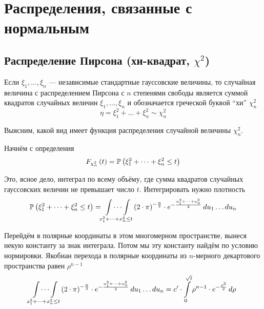 \section{Распределения, связанные с нормальным}

\subsection{Распределение Пирсона (хи-квадрат, $\chi^2$)}

\begin{definition}
  Если $\xi_1, \dots, \xi_n$ --- независимые стандартные гауссовские величины,
  то случайная величина с распределением Пирсона с $n$ степенями свободы
  является суммой квадратов случайных величин $\xi_1, \dots, \xi_n$ и
  обозначается греческой буквой ``хи'' $\chi_n^2$
  $$\eta = \xi_1^2 + \dots + \xi_n^2 \sim \chi_n^2$$
\end{definition}

Выясним, какой вид имеет функция распределения случайной величины $\chi_n^2$.

Начнём с определения
\begin{align*}
  F_{\chi_n^2}\left(t\right)
  = \mathbb{P}\left( \xi_1^2 + \dots + \xi_n^2 \le t \right)
\end{align*}

Это, ясное дело, интеграл по всему объёму, где сумма квадратов случайных
гауссовских величин не превышает число $t$. Интегрировать нужно плотность
\begin{align*}
  \mathbb{P}\left( \xi_1^2 + \dots + \xi_n^2 \le t \right)
  = \idotsint\limits_{x_1^2 + \dots + x_n^2 \le t}
      \left( 2 \cdot \pi \right)^{- \frac{n}{2}}
      \cdot e^{- \frac{u_1^2 + \dots + u_n^2}{2}}
      \, du_1 \dots du_n
\end{align*}

Перейдём в полярные координаты в этом многомерном пространстве, вынеся некую
константу за знак интеграла. Потом мы эту константу найдём по условию
нормировки. Якобиан перехода в полярные координаты из $n$-мерного декартового
пространства равен $\rho^{n-1}$
\begin{align*}
  \idotsint\limits_{x_1^2 + \dots + x_n^2 \le t}
      \left( 2 \cdot \pi \right)^{- \frac{n}{2}}
      \cdot e^{- \frac{u_1^2 + \dots + u_n^2}{2}}
      \, du_1 \dots du_n
  = c' \cdot \int\limits_{0}^{\sqrt{t}} 
      \rho^{n-1} \cdot e^{- \frac{\rho^2}{2}} \, d \rho
\end{align*}

